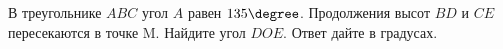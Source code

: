 \begin{ex}
	\begin{condition}
		В треугольнике \( ABC \) угол \( A \) равен \( 135\degree \). Продолжения высот \( BD \) и \( CE \) пересекаются в точке M. Найдите угол \( DOE \). Ответ дайте в градусах.
	\end{condition}
\end{ex}